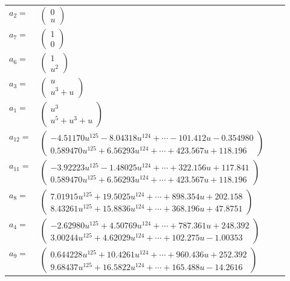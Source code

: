 \documentclass[1p]{elsarticle_modified}
\theoremstyle{definition}
\begin{document}
\begin{tabular}{m{7pt} m{180pt} m{7pt} m{180pt} }
\flushright $a_{2}=$&$\begin{pmatrix}0\\u\end{pmatrix}$ \\
\flushright $a_{7}=$&$\begin{pmatrix}1\\0\end{pmatrix}$ \\
\flushright $a_{6}=$&$\begin{pmatrix}1\\u^2\end{pmatrix}$ \\
\flushright $a_{3}=$&$\begin{pmatrix}u\\u^3+u\end{pmatrix}$ \\
\flushright $a_{1}=$&$\begin{pmatrix}u^3\\u^5+u^3+u\end{pmatrix}$ \\
\flushright $a_{12}=$&$\begin{pmatrix}-4.51170 u^{125}-8.04318 u^{124}+\cdots-101.412 u-0.354980\\0.589470 u^{125}+6.56293 u^{124}+\cdots+423.567 u+118.196\end{pmatrix}$ \\
\flushright $a_{11}=$&$\begin{pmatrix}-3.92223 u^{125}-1.48025 u^{124}+\cdots+322.156 u+117.841\\0.589470 u^{125}+6.56293 u^{124}+\cdots+423.567 u+118.196\end{pmatrix}$ \\
\flushright $a_{8}=$&$\begin{pmatrix}7.01915 u^{125}+19.5025 u^{124}+\cdots+898.354 u+202.158\\8.43261 u^{125}+15.8836 u^{124}+\cdots+368.196 u+47.8751\end{pmatrix}$ \\
\flushright $a_{4}=$&$\begin{pmatrix}-2.62980 u^{125}+4.50769 u^{124}+\cdots+787.361 u+248.392\\3.00244 u^{125}+4.62029 u^{124}+\cdots+102.275 u-1.00353\end{pmatrix}$ \\
\flushright $a_{9}=$&$\begin{pmatrix}0.644228 u^{125}+10.4261 u^{124}+\cdots+960.436 u+252.392\\9.68437 u^{125}+16.5822 u^{124}+\cdots+165.488 u-14.2616\end{pmatrix}$ \\

\end{tabular}
\end{document}
